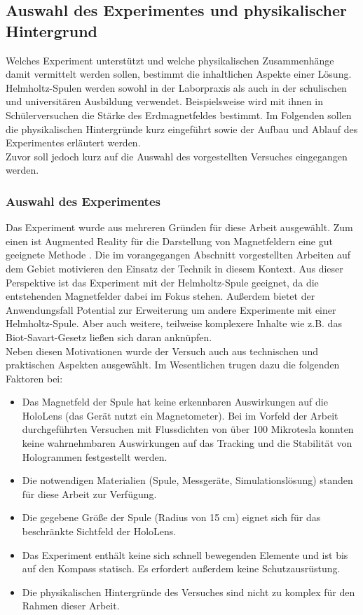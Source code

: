 \subsection{Auswahl des Experimentes und physikalischer Hintergrund}
\label{sec-2-3}
Welches Experiment unterstützt und welche physikalischen Zusammenhänge damit vermittelt werden sollen, bestimmt die inhaltlichen Aspekte einer Lösung. Helmholtz-Spulen werden sowohl in der Laborpraxis als auch in der schulischen und universitären Ausbildung verwendet. Beispielsweise wird mit ihnen in Schülerversuchen die Stärke des Erdmagnetfeldes bestimmt. Im Folgenden sollen die physikalischen Hintergründe kurz eingeführt sowie der Aufbau und Ablauf des Experimentes erläutert werden.\\

Zuvor soll jedoch kurz auf die Auswahl des vorgestellten Versuches eingegangen werden.

\subsubsection{Auswahl des Experimentes}
\label{sec-2-3-1}
Das Experiment wurde aus mehreren Gründen für diese Arbeit ausgewählt. Zum einen ist Augmented Reality für die Darstellung von Magnetfeldern eine gut geeignete Methode \cite{Buchau09}. Die im vorangegangen Abschnitt vorgestellten Arbeiten auf dem Gebiet motivieren den Einsatz der Technik in diesem Kontext. Aus dieser Perspektive ist das Experiment mit der Helmholtz-Spule geeignet, da die entstehenden Magnetfelder dabei im Fokus stehen. Außerdem bietet der Anwendungsfall Potential zur Erweiterung um andere Experimente mit einer Helmholtz-Spule. Aber auch weitere, teilweise komplexere Inhalte wie z.B. das Biot-Savart-Gesetz ließen sich daran anknüpfen.\\

Neben diesen Motivationen wurde der Versuch auch aus technischen und praktischen Aspekten ausgewählt. Im Wesentlichen trugen dazu die folgenden Faktoren bei:
\begin{itemize}
	\singlespacing
	\item Das Magnetfeld der Spule hat keine erkennbaren Auswirkungen auf die HoloLens (das Gerät nutzt ein Magnetometer). Bei im Vorfeld der Arbeit durchgeführten Versuchen mit Flussdichten von über 100 Mikrotesla konnten keine wahrnehmbaren Auswirkungen auf das Tracking und die Stabilität von Hologrammen festgestellt werden.
	\item Die notwendigen Materialien (Spule, Messgeräte, Simulationslösung) standen für diese Arbeit zur Verfügung.
	\item Die gegebene Größe der Spule (Radius von 15 cm) eignet sich für das beschränkte Sichtfeld der HoloLens.
	\item Das Experiment enthält keine sich schnell bewegenden Elemente und ist bis auf den Kompass statisch. Es erfordert außerdem keine Schutzausrüstung.
	\item Die physikalischen Hintergründe des Versuches sind nicht zu komplex für den Rahmen dieser Arbeit.
\end{itemize}

